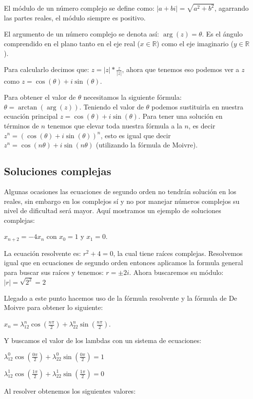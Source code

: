 \documentclass{article}
\begin{document}
El módulo de un número complejo se define como:
$|a+bi|=\sqrt{a^2+b^2}$, agarrando las partes reales, el módulo
siempre es positivo.

El argumento de un número complejo se denota así: $\arg(z)=\theta$. Es
el ángulo comprendido en el plano tanto en el eje real
($x\in\mathbb{R}$) como el eje imaginario ($y\in\mathbb{R}$).

Para calcularlo decimos que:
$z=|z|*\frac{z}{|z|}$, ahora que tenemos eso podemos ver a $z$ como
$z=\cos(\theta)+i\sin(\theta)$.

Para obtener el valor de $\theta$
necesitamos la siguiente fórmula: $\theta=\arctan(\arg(z))$. Teniendo el
valor de $\theta$ podemos sustituirla en nuestra ecuación principal
$z=\cos(\theta)+i\sin(\theta)$. Para tener una solución en términos de
$n$ tenemos que elevar toda nuestra fórmula a la $n$, es decir
$z^n=(\cos(\theta)+i\sin(\theta))^n$, esto es igual que decir
$z^n=\cos(n\theta)+i\sin(n\theta)$ (utilizando la fórmula de Moivre).

\subsection{Soluciones complejas}
\label{sec:complejas}

Algunas ocasiones las ecuaciones de segundo orden no tendrán solución
en los reales, sin embargo en los complejos sí y no por manejar
números complejos su nivel de dificultad será mayor. Aquí mostramos un
ejemplo de soluciones complejas: 

$x_{n+2}=-4x_{n}$ con $x_0=1$ y $x_1=0$.

La ecuación resolvente es: $r^2+4=0$, la cual tiene raíces complejas.
Resolvemos igual que en ecuaciones de segundo orden entonces aplicamos
la formula general para buscar sus raíces y tenemos: $r=\pm2i$.
Ahora buscaremos su módulo: $|r|=\sqrt{2^2}=2$

Llegado a este punto hacemos uso de la fórmula resolvente y la fórmula de De Moivre para obtener lo siguiente:

$x_n=\lambda_12^n\cos(\frac{n\pi}{2})+\lambda_22^n\sin(\frac{n\pi}{2})$.

Y buscamos el valor de los lambdas con un sistema de ecuaciones:

$\lambda_12^0\cos(\frac{0\pi}{2})+\lambda_22^0\sin(\frac{0\pi}{2})=1$

$\lambda_12^1\cos(\frac{1\pi}{2})+\lambda_22^1\sin(\frac{1\pi}{2})=0$

Al resolver obtenemos los siguientes valores:
\end{document}
